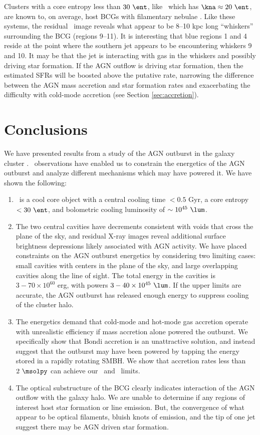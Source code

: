\documentclass[11pt, preprint]{aastex}
\begin{document}
Clusters with a core entropy less than $30 ~\ent$, like \rbs\ which
has $\kna \approx 20 ~\ent$, are known to, on average, host BCGs with
filamentary nebulae \citep[\eg][]{mcdonald10}. Like these systems, the
residual \myi\ image reveals what appear to be 8--10 kpc long
``whiskers'' surrounding the BCG (regions 9--11). It is interesting
that blue regions 1 and 4 reside at the point where the southern jet
appears to be encountering whiskers 9 and 10. It may be that the jet
is interacting with gas in the whiskers and possibly driving star
formation. If the AGN outflow is driving star formation, then the
estimated SFRs will be boosted above the putative rate, narrowing the
difference between the AGN mass accretion and star formation rates and
exacerbating the difficulty with cold-mode accretion (see Section
\ref{sec:accretion}).

\section{Conclusions}
\label{sec:con}

We have presented results from a study of the AGN outburst in the
galaxy cluster \rbs. \cxo\ observations have enabled us to constrain
the energetics of the AGN outburst and analyze different mechanisms
which may have powered it. We have shown the following:
\begin{enumerate}
\item \rbs\ is a cool core object with a central cooling time $< 0.5$
  Gyr, a core entropy $< 30 ~\ent$, and bolometric cooling luminosity
  of $\sim 10^{45} ~\lum$.
\item The two central cavities have decrements consistent with voids
  that cross the plane of the sky, and residual X-ray images reveal
  additional surface brightness depressions likely associated with AGN
  activity. We have placed constraints on the AGN outburst energetics
  by considering two limiting cases: small cavities with centers in
  the plane of the sky, and large overlapping cavities along the line
  of sight. The total energy in the cavities is $3-70 \times 10^{60}$
  erg, with powers $3-40 \times 10^{45} ~\lum$. If the upper limits
  are accurate, the AGN outburst has released enough energy to
  suppress cooling of the cluster halo.
\item The energetics demand that cold-mode and hot-mode gas accretion
  operate with unrealistic efficiency if mass accretion alone powered
  the outburst. We specifically show that Bondi accretion is an
  unattractive solution, and instead suggest that the outburst may
  have been powered by tapping the energy stored in a rapidly rotating
  SMBH. We show that accretion rates less than $2 ~\msolpy$ can
  achieve our \ecav\ and \pcav\ limits.
\item The optical substructure of the BCG clearly indicates
  interaction of the AGN outflow with the galaxy halo. We are unable
  to determine if any regions of interest host star formation or line
  emission. But, the convergence of what appear to be optical
  filaments, bluish knots of emission, and the tip of one jet suggest
  there may be AGN driven star formation.
\end{enumerate}
\end{document}
